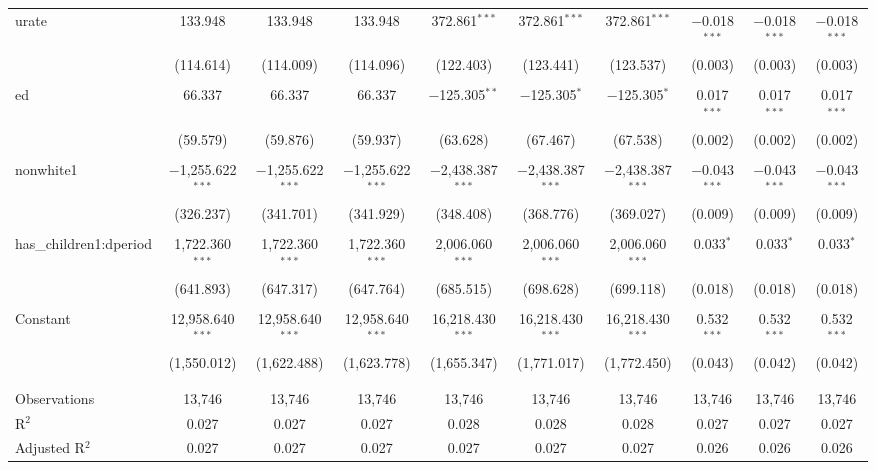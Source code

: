 \documentclass[a4paper]{article}
\begin{document}
\begin{landscape}
\begin{table}[!htbp]
\begin{adjustwidth}{1.25cm}{-0cm}
\begin{threeparttable}
\begin{tabular}{@{\extracolsep{-2pt}}lccccccccc}
 urate & 133.948 & 133.948 & 133.948 & 372.861$^{***}$ & 372.861$^{***}$ & 372.861$^{***}$ & $-$0.018$^{***}$ & $-$0.018$^{***}$ & $-$0.018$^{***}$ \\ 
  & (114.614) & (114.009) & (114.096) & (122.403) & (123.441) & (123.537) & (0.003) & (0.003) & (0.003) \\ 
  & & & & & & & & & \\ 
 ed & 66.337 & 66.337 & 66.337 & $-$125.305$^{**}$ & $-$125.305$^{*}$ & $-$125.305$^{*}$ & 0.017$^{***}$ & 0.017$^{***}$ & 0.017$^{***}$ \\ 
  & (59.579) & (59.876) & (59.937) & (63.628) & (67.467) & (67.538) & (0.002) & (0.002) & (0.002) \\ 
  & & & & & & & & & \\ 
 nonwhite1 & $-$1,255.622$^{***}$ & $-$1,255.622$^{***}$ & $-$1,255.622$^{***}$ & $-$2,438.387$^{***}$ & $-$2,438.387$^{***}$ & $-$2,438.387$^{***}$ & $-$0.043$^{***}$ & $-$0.043$^{***}$ & $-$0.043$^{***}$ \\ 
  & (326.237) & (341.701) & (341.929) & (348.408) & (368.776) & (369.027) & (0.009) & (0.009) & (0.009) \\ 
  & & & & & & & & & \\ 
 has\_children1:dperiod & 1,722.360$^{***}$ & 1,722.360$^{***}$ & 1,722.360$^{***}$ & 2,006.060$^{***}$ & 2,006.060$^{***}$ & 2,006.060$^{***}$ & 0.033$^{*}$ & 0.033$^{*}$ & 0.033$^{*}$ \\ 
  & (641.893) & (647.317) & (647.764) & (685.515) & (698.628) & (699.118) & (0.018) & (0.018) & (0.018) \\ 
  & & & & & & & & & \\ 
 Constant & 12,958.640$^{***}$ & 12,958.640$^{***}$ & 12,958.640$^{***}$ & 16,218.430$^{***}$ & 16,218.430$^{***}$ & 16,218.430$^{***}$ & 0.532$^{***}$ & 0.532$^{***}$ & 0.532$^{***}$ \\ 
  & (1,550.012) & (1,622.488) & (1,623.778) & (1,655.347) & (1,771.017) & (1,772.450) & (0.043) & (0.042) & (0.042) \\ 
  & & & & & & & & & \\ 
\hline \\[-1.8ex] 
Observations & 13,746 & 13,746 & 13,746 & 13,746 & 13,746 & 13,746 & 13,746 & 13,746 & 13,746 \\ 
R$^{2}$ & 0.027 & 0.027 & 0.027 & 0.028 & 0.028 & 0.028 & 0.027 & 0.027 & 0.027 \\ 
Adjusted R$^{2}$ & 0.027 & 0.027 & 0.027 & 0.027 & 0.027 & 0.027 & 0.026 & 0.026 & 0.026 \\ 

\end{tabular}
\end{threeparttable}
\end{adjustwidth}
\end{table}
\end{landscape}
\end{document}
